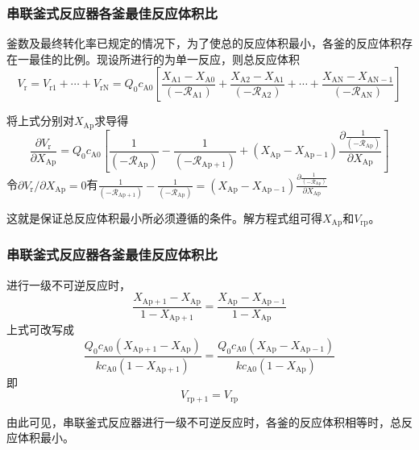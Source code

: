 \begin{frame}
    \frametitle{串联釜式反应器各釜最佳反应体积比}

    釜数及最终转化率已规定的情况下，为了使总的反应体积最小，各釜的反应体积存在一最佳的比例。现设所进行的为单一反应，则总反应体积
    \[
        V_{\mathrm{r}}=V_{\mathrm{r} 1}+\cdots+V_{\mathrm{rN}}=Q_{0} c_{\mathrm{A} 0}\left[\frac{X_{\mathrm{A} 1}-X_{\mathrm{A} 0}}{\left(-\mathscr{R}_{\mathrm{A} 1}\right)}+\frac{X_{\mathrm{A} 2}-X_{\mathrm{A} 1}}{\left(-\mathscr{R}_{\mathrm{A} 2}\right)}+\cdots+\frac{X_{\mathrm{AN}}-X_{\mathrm{AN}-1}}{\left(-\mathscr{R}_{\mathrm{AN}}\right)}\right]
    \]

    将上式分别对$X_\mathrm{Ap}$求导得
    \[
        \frac{\partial V_{\mathrm{r}}}{\partial X_{\mathrm{Ap}}}=Q_{0} c_{\mathrm{A} 0}\left[\frac{1}{\left(-\mathscr{R}_{\mathrm{Ap}}\right)}-\frac{1}{\left(-\mathscr{R}_{\mathrm{Ap}+1}\right)}+\left(X_{\mathrm{Ap}}-X_{\mathrm{Ap}-1}\right) \frac{\partial \frac{1}{\left(-\mathscr{R}_{\mathrm{Ap}}\right)}}{\partial X_{\mathrm{Ap}}}\right]
    \]
    令${\partial V_{\mathrm{r}}}/{\partial X_{\mathrm{Ap}}}=0$有$\frac{1}{\left(-\mathscr{R}_{\mathrm{Ap}+1}\right)}-\frac{1}{\left(-\mathscr{R}_{\mathrm{Ap}}\right)}=\left(X_{\mathrm{Ap}}-X_{\mathrm{Ap}-1}\right) \frac{\partial \frac{1}{\left(-\mathscr{R}_{\mathrm{Ap}}\right)}}{\partial X_{\mathrm{Ap}}}$
    
    这就是保证总反应体积最小所必须遵循的条件。解方程式组可得$X_{\mathrm{Ap}}$和$V_{\mathrm{rp}}$。
    
\end{frame}


\begin{frame}
    \frametitle{串联釜式反应器各釜最佳反应体积比}

    进行一级不可逆反应时，
    \[
        \frac{X_{\mathrm{Ap}+1}-X_{\mathrm{Ap}}}{1-X_{\mathrm{Ap}+1}}=\frac{X_{\mathrm{Ap}}-X_{\mathrm{Ap}-1}}{1-X_{\mathrm{Ap}}}
    \]
    上式可改写成
    \[
        \frac{Q_{0} c_{\mathrm{A} 0}(X_{\mathrm{Ap}+1}-X_{\mathrm{Ap}})}{k c_{\mathrm{A} 0}(1-X_{\mathrm{Ap}+1})}=\frac{Q_{0} c_{\mathrm{A} 0}(X_{\mathrm{Ap}}-X_{\mathrm{Ap}-1})}{k c_{\mathrm{A} 0}(1-X_{\mathrm{Ap}})}
    \]
    即\[V_{\mathrm{rp}+1}=V_{\mathrm{rp}}\]

    由此可见，串联釜式反应器进行一级不可逆反应时，各釜的反应体积相等时，总反应体积最小。

\end{frame}


